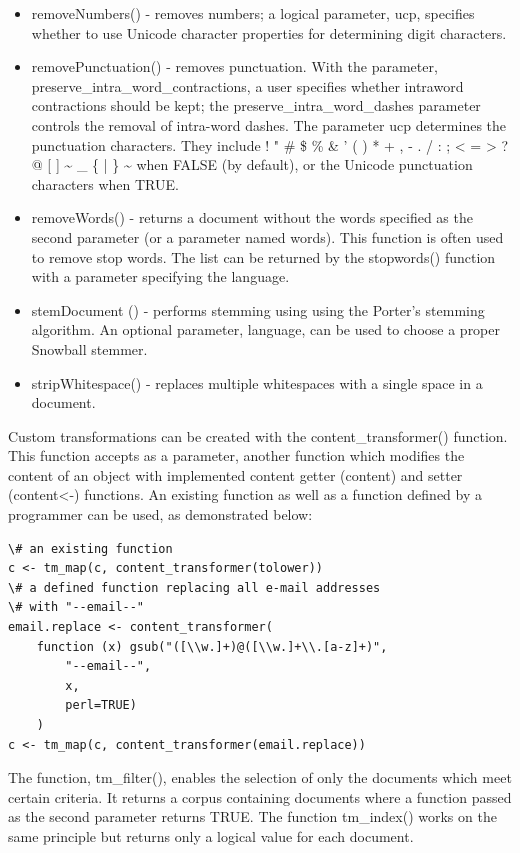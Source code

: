 \documentclass[11pt,openany,executivepaper]{book}
\begin{document}
\begin{itemize}
  \item removeNumbers() - removes numbers; a logical parameter, ucp, specifies whether to use Unicode character properties for determining digit characters.
  \item removePunctuation() - removes punctuation. With the parameter, preserve\_intra\_word\_contractions, a user specifies whether intraword contractions should be kept; the preserve\_intra\_word\_dashes parameter controls the removal of intra-word dashes. The parameter ucp determines the punctuation characters. They include ! " \# \$ \% \& ' ( ) * + , - . / : ; < = > ? @ [ ] \~{} \_ \{ | \} \~{} when FALSE (by default), or the Unicode punctuation characters when TRUE.
  \item removeWords() - returns a document without the words specified as the second parameter (or a parameter named words). This function is often used to remove stop words. The list can be returned by the stopwords() function with a parameter specifying the language.
  \item stemDocument () - performs stemming using using the Porter's stemming algorithm. An optional parameter, language, can be used to choose a proper Snowball stemmer.
  \item stripWhitespace() - replaces multiple whitespaces with a single space in a document.
\end{itemize}

Custom transformations can be created with the content\_transformer() function. This function accepts as a parameter, another function which modifies the content of an object with implemented content getter (content) and setter (content<-) functions. An existing function as well as a function defined by a programmer can be used, as demonstrated below:

\begin{verbatim}
\# an existing function
c <- tm_map(c, content_transformer(tolower))
\# a defined function replacing all e-mail addresses
\# with "--email--"
email.replace <- content_transformer(
    function (x) gsub("([\\w.]+)@([\\w.]+\\.[a-z]+)",
        "--email--",
        x,
        perl=TRUE)
    )
c <- tm_map(c, content_transformer(email.replace))
\end{verbatim}

The function, tm\_filter(), enables the selection of only the documents which meet certain criteria. It returns a corpus containing documents where a function passed as the second parameter returns TRUE. The function tm\_index() works on the same principle but returns only a logical value for each document.
\end{document}

